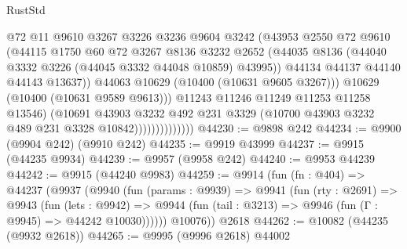 \begin{lexlean}{RustStd}
\begin{coremodule}
                                  @72
                                  @11
                                  @9610
                                  @3267
                                  @3226
                                  @3236
                                  @9604
                                  @3242
                                  (@43953
                                    @2550
                                    @72
                                    @9610
                                    (@44115
                                      @1750
                                      @60
                                      @72
                                      @3267
                                      @8136
                                      @3232
                                      @2652
                                      (@44035
                                        @8136
                                        (@44040 @3332 @3226 (@44045 @3332 @44048 @10859) @43995))
                                      @44134
                                      @44137
                                      @44140
                                      @44143
                                      @13637))
                                  @44063
                                  @10629
                                  (@10400 (@10631 @9605 @3267)))
                                @10629
                                (@10400 (@10631 @9589 @9613)))
                              @11243
                              @11246
                              @11249
                              @11253
                              @11258
                              @13546)
                            (@10691
                              @43903
                              @3232
                              @492
                              @231
                              @3329
                              (@10700 @43903 @3232 @489 @231 @3328 @10842))))))))))))))
@44230 := @9898 @242
@44234 := @9900 (@9904 @242) (@9910 @242)
@44235 := @9919 @43999
@44237 := @9915 (@44235 @9934)
@44239 := @9957 (@9958 @242)
@44240 := @9953 @44239
@44242 := @9915 (@44240 @9983)
@44259 := @9914
    (fun (fn : @404) =>
    @44237
      (@9937
        (@9940
          (fun (params : @9939) =>
          @9941
            (fun (rty : @2691) =>
            @9943
              (fun (lets : @9942) =>
              @9944 (fun (tail : @3213) => @9946 (fun (Γ : @9945) => @44242 @10030))))))
        @10076))
    @2618
@44262 := @10082 (@44235 (@9932 @2618))
@44265 := @9995 (@9996 @2618) @44002

\end{coremodule}
\end{lexlean}
